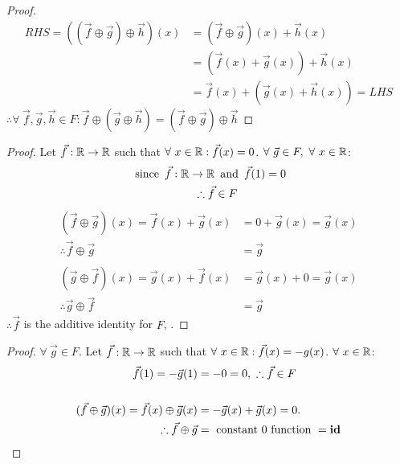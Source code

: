 \begin{enumerate}
\begin{proof}
\begin{align*}
      RHS = ((\vec{f} \oplus \vec{g}) \oplus \vec{h})(x) & = (\vec{f} \oplus \vec{g})(x) + \vec{h}(x)     \\
                                                         & = (\vec{f}(x) + \vec{g}(x)) + \vec{h}(x)       \\
                                                         & = \vec{f}(x) + (\vec{g}(x) + \vec{h}(x)) = LHS
    \end{align*}
    $\therefore \forall~\vec{f},\vec{g},\vec{h} \in F: \vec{f} \oplus (\vec{g} \oplus \vec{h}) = (\vec{f} \oplus \vec{g}) \oplus \vec{h}$
  \end{proof}
  \begin{proof}
    Let $\vec{f}: \mathbb{R} \rightarrow \mathbb{R}$ such that $\forall~x \in \mathbb{R}: \vec{f}(x) = 0$. $\forall~\vec{g} \in F,~\forall~x \in \mathbb{R}$:
    \begin{align*}
      \operatorname{~\text{since}~} \vec{f}: \mathbb{R} \rightarrow \mathbb{R} & \operatorname{~\text{and}~} \vec{f}(1) = 0 \\
      \therefore \vec{f}                         & \in F
    \end{align*}
    \begin{align*}
      (\vec{f} \oplus \vec{g})(x) = \vec{f}(x) + \vec{g}(x) & = 0 + \vec{g}(x)= \vec{g}(x) \\
      \therefore \vec{f} \oplus \vec{g}                     & = \vec{g}                    \\ \\
      (\vec{g} \oplus \vec{f})(x) = \vec{g}(x) + \vec{f}(x) & = \vec{g}(x) + 0= \vec{g}(x) \\
      \therefore \vec{g} \oplus \vec{f}                     & = \vec{g}
    \end{align*}
    $\therefore \vec{f}$ is the additive identity for $F$, .
  \end{proof}
  \begin{proof}
    $\forall~\vec{g} \in F$. Let $\vec{f}: \mathbb{R} \rightarrow \mathbb{R}$ such that $\forall~x \in \mathbb{R}: \vec{f}(x) = -g(x)$. $\forall~x \in \mathbb{R}$:
    \begin{align*}
      \vec{f}(1) = -\vec{g}(1)                                   & = -0 = 0,~\therefore \vec{f} \in F        \\ \\
      (\vec{f} \oplus \vec{g})(x) = \vec{f}(x) \oplus \vec{g}(x) & = -\vec{g}(x) + \vec{g}(x)= 0.            \\
      \therefore \vec{f} \oplus \vec{g}                          & = ~\text{constant 0 function}~ = \bld{id} \\

\end{align*}
\end{proof}
\end{enumerate}
